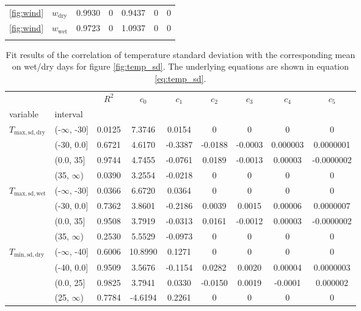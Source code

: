 \documentclass[
11pt, %
english, %
singlespacing, %
headsepline, %
]{MastersDoctoralThesis} %
\newcommand\tophline{\hline\noalign{\vspace{1mm}}}
\newcommand\middlehline{\noalign{\vspace{1mm}}\hline\noalign{\vspace{1mm}}}
\newcommand\bottomhline{\noalign{\vspace{1mm}}\hline}
\begin{document}
\begin{NoHyper}
\begin{refsection}
\begin{table}[t]
\begin{tabular}{llccccc}
		\ref{fig:wind} &  $w_{\mathrm{dry}}$ & 0.9930 & 0 & 0.9437 & 0 & 0 \\
		\ref{fig:wind} &  $w_{\mathrm{wet}}$ & 0.9723 & 0 & 1.0937 & 0 & 0 \\
		\bottomhline
	\end{tabular}
\end{table}
\begin{table}[t]
	\caption[Fit results of the correlation of temperature standard deviation with the mean.]{Fit results of the correlation of temperature standard deviation with the corresponding mean on wet/dry days for figure \ref{fig:temp_sd}. The underlying equations are shown in equation \eqref{eq:temp_sd}.}
	\label{tab:t-sd-corr}
	\begin{tabular}{llccccccc}
		\tophline
		&            &  $R^2$ &   $c_0$ &   $c_1$ &   $c_2$ &   $c_3$ &    $c_4$ &      $c_5$ \\
		variable & interval &        &         &         &         &         &          &            \\
		\middlehline
		$T_{\mathrm{max}, \mathrm{sd}, \mathrm{dry}}$ & (-$\infty$, -30] & 0.0125 & 7.3746 & 0.0154 & 0 & 0 & 0 & 0 \\
		& (-30, 0.0] & 0.6721 & 4.6170 & -0.3387 & -0.0188 & -0.0003 & 0.000003 & 0.0000001 \\
		& (0.0, 35] & 0.9744 & 4.7455 & -0.0761 & 0.0189 & -0.0013 & 0.00003 & -0.0000002 \\
		& (35, $\infty$) & 0.0390 & 3.2554 & -0.0218 & 0 & 0 & 0 & 0 \\
		$T_{\mathrm{max}, \mathrm{sd}, \mathrm{wet}}$ & (-$\infty$, -30] & 0.0366 & 6.6720 & 0.0364 & 0 & 0 & 0 & 0 \\
		& (-30, 0.0] & 0.7362 & 3.8601 & -0.2186 & 0.0039 & 0.0015 & 0.00006 & 0.0000007 \\
		& (0.0, 35] & 0.9508 & 3.7919 & -0.0313 & 0.0161 & -0.0012 & 0.00003 & -0.0000002 \\
		& (35, $\infty$) & 0.2530 & 5.5529 & -0.0973 & 0 & 0 & 0 & 0 \\
		$T_{\mathrm{min}, \mathrm{sd}, \mathrm{dry}}$ & (-$\infty$, -40] & 0.6006 & 10.8990 & 0.1271 & 0 & 0 & 0 & 0 \\
		& (-40, 0.0] & 0.9509 & 3.5676 & -0.1154 & 0.0282 & 0.0020 & 0.00004 & 0.0000003 \\
		& (0.0, 25] & 0.9825 & 3.7941 & 0.0330 & -0.0150 & 0.0019 & -0.0001 & 0.000002 \\
		& (25, $\infty$) & 0.7784 & -4.6194 & 0.2261 & 0 & 0 & 0 & 0 \\

\end{tabular}
\end{table}
\end{refsection}
\end{NoHyper}
\end{document}
